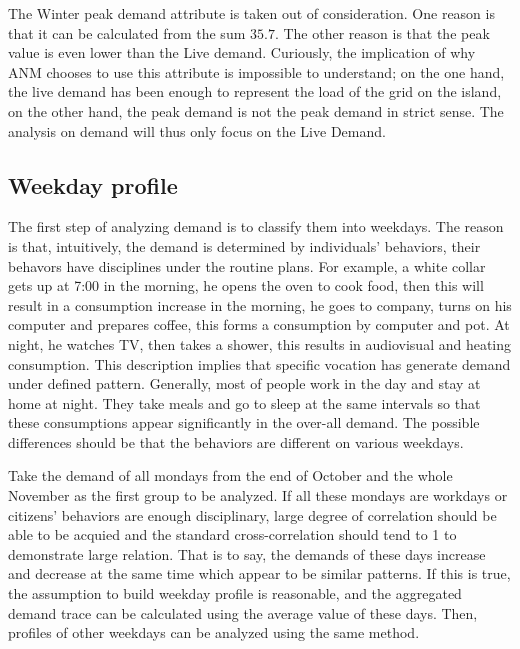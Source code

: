 \documentclass[12pt,a4paper]{report}
\begin{document}
                The Winter peak demand attribute is taken out of consideration. One reason is that it can be calculated from the sum $35.7$. The other reason is that
                the peak value is even lower than the Live demand. Curiously, the implication of why ANM chooses to use this attribute is impossible to understand; on the one hand,
                the live demand has been enough to represent the load of the grid on the island, on the other hand, the peak demand is not the peak demand in strict sense.
                The analysis on demand will thus only focus on the Live Demand.

                \subsection{Weekday profile}
                The first step of analyzing demand is to classify them into weekdays. The reason is that, intuitively, the demand is determined by individuals' behaviors, their behavors
                have disciplines under the routine plans. For example, a white collar gets up at 7:00 in the morning, he opens the oven to cook food, then this will result in a consumption
                increase in the morning, he goes to company, turns on his computer and prepares coffee, this forms a consumption by computer and pot. At night, he watches TV, then takes a shower, this
                results in audiovisual and heating consumption. This description implies that specific vocation has generate demand under defined pattern. Generally, most of people work in the day and 
                stay at home at night. They take meals and go to sleep at the same intervals so that these consumptions appear significantly in the over-all demand. The possible differences should be
                that the behaviors are different on various weekdays.

                Take the demand of all mondays from the end of October and the whole November as the first group to be analyzed. If all these mondays are workdays or citizens' behaviors are
                enough disciplinary, large degree of correlation should be able to be acquied and the standard cross-correlation should tend to 1 to demonstrate large relation. That is to say, 
                the demands of these days increase and decrease at the same time which appear to be similar patterns. If this is true,
                the assumption to build weekday profile is reasonable, and the aggregated demand trace can be calculated using the average value of these days. Then, profiles of other weekdays can be analyzed using the same method.
\end{document}
